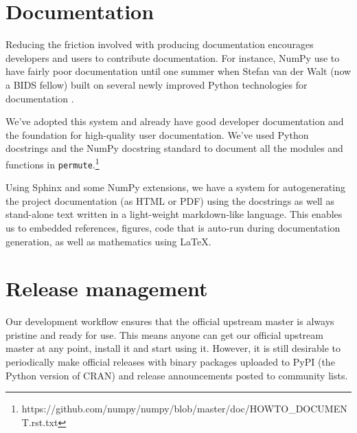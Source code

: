 %
%
%
%
%
%

\section{\label{sec:doc}Documentation}

Reducing the friction involved with producing documentation encourages
developers and users to contribute documentation.  For instance, NumPy use to
have fairly poor documentation until one summer when Stefan van der Walt (now a
BIDS fellow) built on several newly improved Python technologies for
documentation \cite{SciPyProceedings_27}.

We've adopted this system and already have good developer documentation and the
foundation for high-quality user documentation. We've used Python docstrings and
the NumPy docstring standard to document all the modules and functions in
\texttt{permute}.\footnote{https://github.com/numpy/numpy/blob/master/doc/HOWTO\_DOCUMENT.rst.txt}

Using Sphinx and some NumPy extensions, we have a system for autogenerating the
project documentation (as HTML or PDF) using the docstrings as well as
stand-alone text written in a light-weight markdown-like language.  This
enables us to embedded references, figures, code that is auto-run during
documentation generation, as well as mathematics using \LaTeX.

%

\section{\label{sec:release}Release management}

Our development workflow ensures that the official upstream master is always
pristine and ready for use.  This means anyone can get our official upstream
master at any point, install it and start using it.  However, it is still
desirable to periodically make official releases with binary packages uploaded
to PyPI (the Python version of CRAN) and release announcements posted to
community lists.

